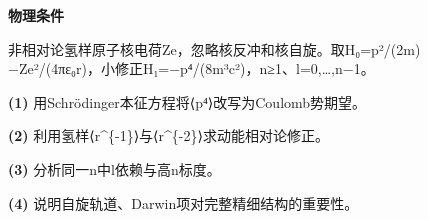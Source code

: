 \textbf{物理条件}\par 非相对论氢样原子核电荷Ze，忽略核反冲和核自旋。取H₀=p²/(2m)−Ze²/(4πε₀r)，小修正H₁=−p⁴/(8m³c²)，n≥1、l=0,…,n−1。
\par\noindent\textbf{(1)} 用Schrödinger本征方程将⟨p⁴⟩改写为Coulomb势期望。
\par\noindent\textbf{(2)} 利用氢样⟨r\textasciicircum{}\{-1\}⟩与⟨r\textasciicircum{}\{-2\}⟩求动能相对论修正。
\par\noindent\textbf{(3)} 分析同一n中l依赖与高n标度。
\par\noindent\textbf{(4)} 说明自旋轨道、Darwin项对完整精细结构的重要性。
